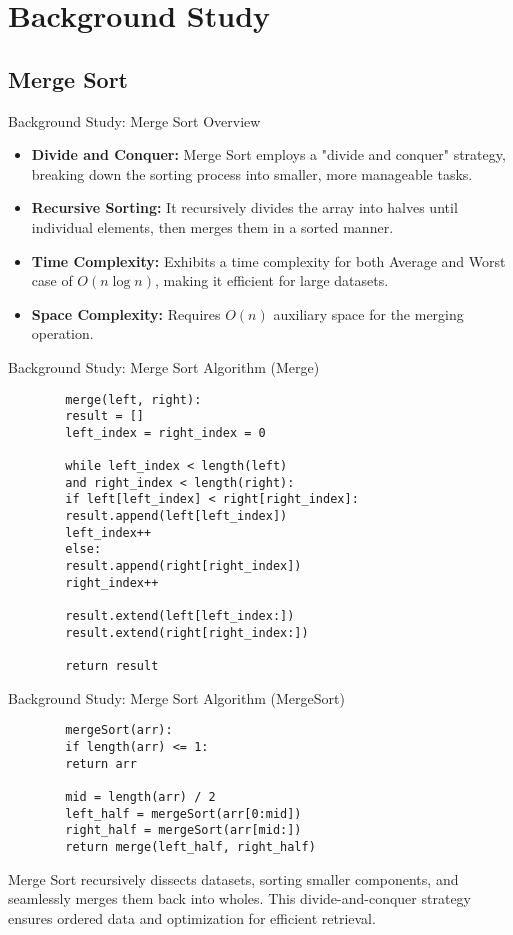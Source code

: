 \documentclass{beamer}
\begin{document}
\section{Background Study}

\subsection{Merge Sort}

\begin{frame}{Background Study: Merge Sort Overview}
	\begin{itemize}
		\item \textbf{Divide and Conquer:} Merge Sort employs a "divide and conquer" strategy, breaking down the sorting process into smaller, more manageable tasks.
		\item \textbf{Recursive Sorting:} It recursively divides the array into halves until individual elements, then merges them in a sorted manner.
		\item \textbf{Time Complexity:} Exhibits a time complexity for both Average and Worst case of $O(n \log n)$, making it efficient for large datasets.
		\item \textbf{Space Complexity:} Requires $O(n)$ auxiliary space for the merging operation. \cite{geeksforgeeks-merge-sort}
	\end{itemize}
\end{frame}

\begin{frame}[fragile]{Background Study: Merge Sort Algorithm (Merge)}
	\begin{verbatim}
		merge(left, right):
		result = []
		left_index = right_index = 0
		
		while left_index < length(left) 
		and right_index < length(right):
		if left[left_index] < right[right_index]:
		result.append(left[left_index])
		left_index++
		else:
		result.append(right[right_index])
		right_index++
		
		result.extend(left[left_index:])
		result.extend(right[right_index:])
		
		return result
	\end{verbatim}
\end{frame}

\begin{frame}[fragile]{Background Study: Merge Sort Algorithm (MergeSort)}
	\begin{verbatim}
		mergeSort(arr):
		if length(arr) <= 1:
		return arr
		
		mid = length(arr) / 2
		left_half = mergeSort(arr[0:mid])
		right_half = mergeSort(arr[mid:])
		return merge(left_half, right_half)
	\end{verbatim}
	Merge Sort recursively dissects datasets, sorting smaller components, and seamlessly merges them back into wholes. This divide-and-conquer strategy ensures ordered data and optimization for efficient retrieval.
\end{frame}
\end{document}
